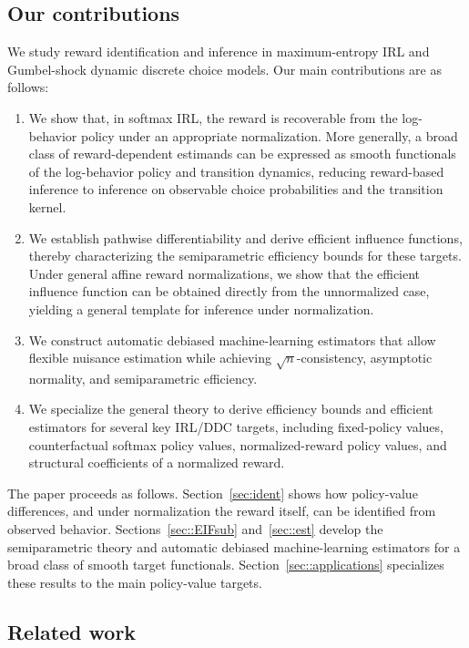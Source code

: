 \documentclass[12pt]{article}
\theoremstyle{plain}
\begin{document}
\subsection{Our contributions}
We study reward identification and inference in maximum-entropy IRL and
Gumbel-shock dynamic discrete choice models. Our main contributions are as follows:
\begin{enumerate}
\item We show that, in softmax IRL, the reward is recoverable from the
log-behavior policy under an appropriate normalization. More generally, a broad
class of reward-dependent estimands can be expressed as smooth functionals of
the log-behavior policy and transition dynamics, reducing reward-based
inference to inference on observable choice probabilities and the transition
kernel.

\item We establish pathwise differentiability and derive efficient influence
functions, thereby characterizing the semiparametric efficiency bounds for
these targets. Under general affine reward normalizations, we show that the
efficient influence function can be obtained directly from the unnormalized
case, yielding a general template for inference under normalization.

\item We construct automatic debiased machine-learning estimators
\citep{chernozhukov2022automatic, van2025automatic} that allow flexible
nuisance estimation while achieving \(\sqrt{n}\)-consistency, asymptotic
normality, and semiparametric efficiency.

\item We specialize the general theory to derive efficiency bounds and
efficient estimators for several key IRL/DDC targets, including fixed-policy
values, counterfactual softmax policy values, normalized-reward policy values,
and structural coefficients of a normalized reward.
\end{enumerate}

The paper proceeds as follows. Section~\ref{sec:ident} shows how policy-value
differences, and under normalization the reward itself, can be identified from
observed behavior. Sections~\ref{sec::EIFsub} and~\ref{sec::est} develop the
semiparametric theory and automatic debiased machine-learning estimators for a
broad class of smooth target functionals. Section~\ref{sec::applications}
specializes these results to the main policy-value targets.

\subsection{Related work}
\end{document}
